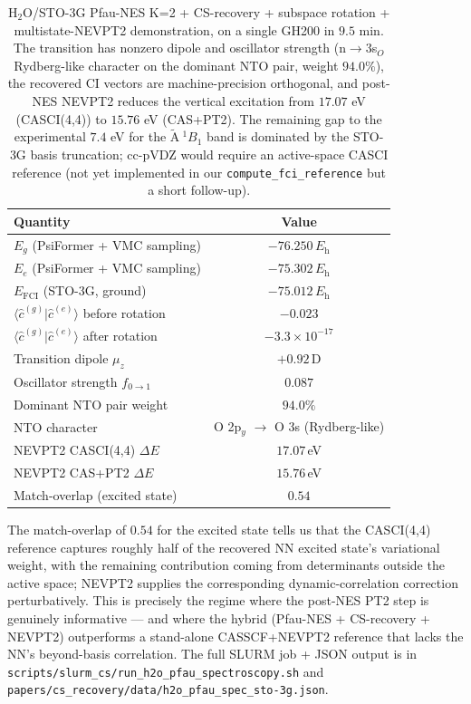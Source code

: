 \documentclass[journal=jctcce,manuscript=suppinfo,layout=traditional]{achemso}
\begin{document}
\begin{table}[h]
\centering
\caption{H$_2$O/STO-3G Pfau-NES K=2 + CS-recovery + subspace
rotation + multistate-NEVPT2 demonstration, on a single GH200
in $9.5$ min. The transition has nonzero dipole and oscillator
strength (n$\to$3s$_O$ Rydberg-like character on the dominant
NTO pair, weight $94.0\%$), the recovered CI vectors are
machine-precision orthogonal, and post-NES NEVPT2 reduces the
vertical excitation from $17.07$ eV (CASCI(4,4)) to $15.76$ eV
(CAS+PT2). The remaining gap to the experimental $7.4$ eV for the
$\tilde{\mathrm{A}}\ ^1B_1$ band is dominated by the STO-3G basis
truncation; cc-pVDZ would require an active-space CASCI reference
(not yet implemented in our \texttt{compute\_fci\_reference} but a
short follow-up).}
\label{tab:h2o_pfau}
\small
\begin{tabular}{lc}
\hline
Quantity & Value \\
\hline
$E_g$ (PsiFormer + VMC sampling) & $-76.250\,E_{\mathrm{h}}$ \\
$E_e$ (PsiFormer + VMC sampling) & $-75.302\,E_{\mathrm{h}}$ \\
$E_{\mathrm{FCI}}$ (STO-3G, ground) & $-75.012\,E_{\mathrm{h}}$ \\
$\langle \widehat{c}^{(g)} | \widehat{c}^{(e)} \rangle$ before rotation & $-0.023$ \\
$\langle \widehat{c}^{(g)} | \widehat{c}^{(e)} \rangle$ after rotation & $-3.3\times 10^{-17}$ \\
Transition dipole $\mu_z$ & $+0.92\,$D \\
Oscillator strength $f_{0\to 1}$ & $0.087$ \\
Dominant NTO pair weight & $94.0\%$ \\
NTO character & O 2p$_y$ $\to$ O 3s (Rydberg-like) \\
NEVPT2 CASCI(4,4) $\Delta E$ & $17.07\,$eV \\
NEVPT2 CAS+PT2 $\Delta E$ & $15.76\,$eV \\
Match-overlap (excited state) & $0.54$ \\
\hline
\end{tabular}
\end{table}

\noindent The match-overlap of $0.54$ for the excited state tells
us that the CASCI(4,4) reference captures roughly half of the
recovered NN excited state's variational weight, with the
remaining contribution coming from determinants outside the
active space; NEVPT2 supplies the corresponding dynamic-correlation
correction perturbatively. This is precisely the regime where the
post-NES PT2 step is genuinely informative --- and where the
hybrid (Pfau-NES + CS-recovery + NEVPT2) outperforms a stand-alone
CASSCF+NEVPT2 reference that lacks the NN's beyond-basis
correlation. The full SLURM job + JSON output is in
\texttt{scripts/slurm\_cs/run\_h2o\_pfau\_spectroscopy.sh} and
\texttt{papers/cs\_recovery/data/h2o\_pfau\_spec\_sto-3g.json}.
\end{document}
